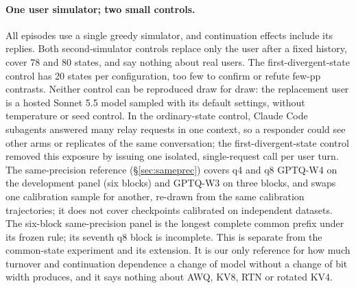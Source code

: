 \paragraph{One user simulator; two small controls.} All \tautwo{} episodes use a single greedy simulator, and continuation effects include its replies. Both second-simulator controls replace only the user after a fixed history, cover 78 and 80 states, and say nothing about real users. The first-divergent-state control has 20 states per configuration, too few to confirm or refute few-pp contrasts. %
Neither control can be reproduced draw for draw: the replacement user is a hosted Sonnet 5.5 model sampled with its default settings, without temperature or seed control. In the ordinary-state control, Claude Code subagents answered many relay requests in one context, so a responder could see other arms or replicates of the same conversation; the first-divergent-state control removed this exposure by issuing one isolated, single-request call per user turn. %
The same-precision reference (\S\ref{sec:sameprec}) covers q4 and q8 GPTQ-W4 on the development panel (six blocks) and GPTQ-W3 on three blocks, and swaps one calibration sample for another, re-drawn from the same calibration trajectories; it does not cover checkpoints calibrated on independent datasets. The six-block same-precision panel is the longest complete common prefix under its frozen rule; its seventh q8 block is incomplete. This is separate from the common-state experiment and its extension. It is our only reference for how much turnover and continuation dependence a change of model without a change of bit width produces, and it says nothing about AWQ, KV8, RTN or rotated KV4.


